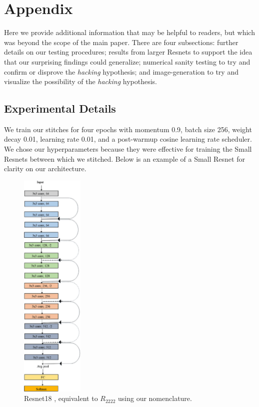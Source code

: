 \documentclass{article}
\begin{document}
\section{Appendix}
Here we provide additional information that may be helpful to readers, but which was
beyond the scope of the main paper. There are four subsections: further details on our
testing procedures; results from larger Resnets to support the idea that our surprising findings
could generalize; numerical sanity testing to try and confirm or disprove the \textit{hacking}
hypothesis; and image-generation to try and visualize the possibility of the \textit{hacking}
hypothesis.
\subsection*{Experimental Details}
We train our stitches for four epochs with momentum 0.9,
batch size 256, weight decay 0.01, learning rate 0.01, and 
a post-warmup cosine learning rate scheduler. We chose our
hyperparameters because they were effective for training the
Small Resnets between which we stitched. Below is an example of
a Small Resnet for clarity on our architecture.
\begin{center}
  \begin{figure}[H]
     \centering
     \includegraphics[width=3cm]{resnet18-arch.png}
     \caption{Resnet18 \cite{He2016DeepRL}, equivalent to $R_{2222}$
     using our nomenclature.}
  \end{figure}
\end{center}
\end{document}
